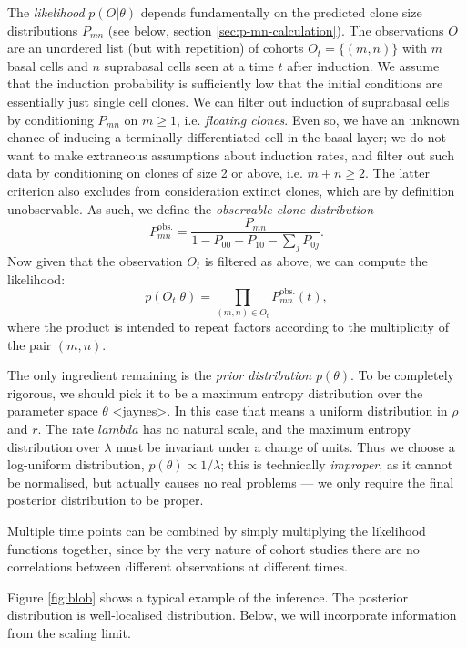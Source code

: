 \documentclass[10pt,UKenglish]{article}
\begin{document}
The \emph{likelihood} $p(O|\theta)$ depends fundamentally on the predicted clone size distributions $P_{mn}$ (see below, section \ref{sec:p-mn-calculation}). The observations $O$ are an unordered list (but with repetition) of cohorts $O_t = \{(m,n)\}$ with $m$ basal cells and $n$ suprabasal cells seen at a time $t$ after induction. We assume that the induction probability is sufficiently low that the initial conditions are essentially just single cell clones. We can filter out induction of suprabasal cells by conditioning $P_{mn}$ on $m \ge 1$, i.e. \emph{floating clones}. Even so, we have an unknown chance of inducing a terminally differentiated cell in the basal layer; we do not want to make extraneous assumptions about induction rates, and filter out such data by conditioning on clones of size 2 or above, i.e. $m+n \ge 2$. The latter criterion also excludes from consideration extinct clones, which are by definition unobservable. As such, we define the \emph{observable clone distribution} $$P^\textrm{obs.}_{mn} = \frac{P_{mn}}{1 - P_{00} - P_{10} - \sum_j P_{0j}}.$$ Now given that the observation $O_t$ is filtered as above, we can compute the likelihood: $$p(O_t|\theta) = \prod_{(m,n) \in O_t} P^\textrm{obs.}_{mn}(t),$$ where the product is intended to repeat factors according to the multiplicity of the pair $(m,n)$.

The only ingredient remaining is the \emph{prior distribution} $p(\theta)$. To be completely rigorous, we should pick it to be a maximum entropy distribution over the parameter space $\theta$ <jaynes>. In this case that means a uniform distribution in $\rho$ and $r$. The rate $lambda$ has no natural scale, and the maximum entropy distribution over $\lambda$ must be invariant under a change of units. Thus we choose a log-uniform distribution, $p(\theta) \propto 1/\lambda$; this is technically \emph{improper}, as it cannot be normalised, but actually causes no real problems --- we only require the final posterior distribution to be proper.

Multiple time points can be combined by simply multiplying the likelihood functions together, since by the very nature of cohort studies there are no correlations between different observations at different times.

Figure \ref{fig:blob} shows a typical example of the inference. The posterior distribution is well-localised distribution. Below, we will incorporate information from the scaling limit.
\end{document}
